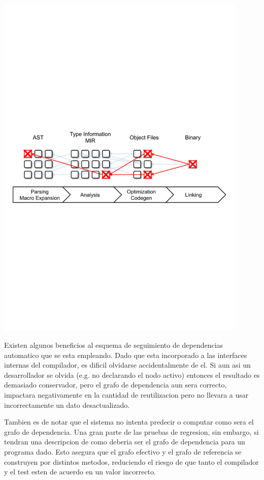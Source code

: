\documentclass[12pt, a4paper]{report}
\begin{document}
\noindent
\includegraphics[width=0.9\textwidth]{woe16_compiler_cache_purge}

Existen algunos beneficios al esquema de seguimiento de dependencias automatico que se esta empleando.
Dado que esta incorporado a las interfaces internas del compilador, es dificil olvidarse accidentalmente de el.
Si aun asi un desarrollador se olvida (e.g. no declarando el nodo activo) entonces el resultado es demasiado conservador, pero el grafo de dependencia aun sera correcto, impactara negativamente en la cantidad de reutilizacion pero no llevara a usar incorrectamente un dato desactualizado.
\cite{rust_blog_incremental_compilation}

Tambien es de notar que el sistema no intenta predecir o computar como sera el grafo de dependencia.
Una gran parte de las pruebas de regresion, sin embargo, si tendran una descripcion de como deberia ser el grafo de dependencia para un programa dado.
Esto asegura que el grafo efectivo y el grafo de referencia se construyen por distintos metodos, reduciendo el riesgo de que tanto el compilador y el test esten de acuerdo en un valor incorrecto.
\cite{rust_blog_incremental_compilation}
\end{document}
